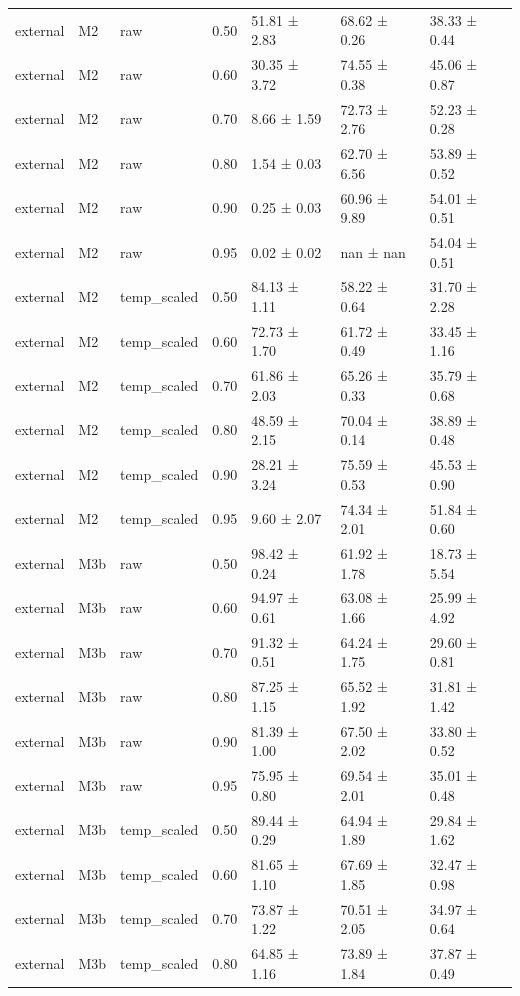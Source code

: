 \begin{tabular}{lllrlll}
external & M2 & raw & 0.50 & 51.81 ± 2.83 & 68.62 ± 0.26 & 38.33 ± 0.44 \\
external & M2 & raw & 0.60 & 30.35 ± 3.72 & 74.55 ± 0.38 & 45.06 ± 0.87 \\
external & M2 & raw & 0.70 & 8.66 ± 1.59 & 72.73 ± 2.76 & 52.23 ± 0.28 \\
external & M2 & raw & 0.80 & 1.54 ± 0.03 & 62.70 ± 6.56 & 53.89 ± 0.52 \\
external & M2 & raw & 0.90 & 0.25 ± 0.03 & 60.96 ± 9.89 & 54.01 ± 0.51 \\
external & M2 & raw & 0.95 & 0.02 ± 0.02 & nan ± nan & 54.04 ± 0.51 \\
external & M2 & temp\_scaled & 0.50 & 84.13 ± 1.11 & 58.22 ± 0.64 & 31.70 ± 2.28 \\
external & M2 & temp\_scaled & 0.60 & 72.73 ± 1.70 & 61.72 ± 0.49 & 33.45 ± 1.16 \\
external & M2 & temp\_scaled & 0.70 & 61.86 ± 2.03 & 65.26 ± 0.33 & 35.79 ± 0.68 \\
external & M2 & temp\_scaled & 0.80 & 48.59 ± 2.15 & 70.04 ± 0.14 & 38.89 ± 0.48 \\
external & M2 & temp\_scaled & 0.90 & 28.21 ± 3.24 & 75.59 ± 0.53 & 45.53 ± 0.90 \\
external & M2 & temp\_scaled & 0.95 & 9.60 ± 2.07 & 74.34 ± 2.01 & 51.84 ± 0.60 \\
external & M3b & raw & 0.50 & 98.42 ± 0.24 & 61.92 ± 1.78 & 18.73 ± 5.54 \\
external & M3b & raw & 0.60 & 94.97 ± 0.61 & 63.08 ± 1.66 & 25.99 ± 4.92 \\
external & M3b & raw & 0.70 & 91.32 ± 0.51 & 64.24 ± 1.75 & 29.60 ± 0.81 \\
external & M3b & raw & 0.80 & 87.25 ± 1.15 & 65.52 ± 1.92 & 31.81 ± 1.42 \\
external & M3b & raw & 0.90 & 81.39 ± 1.00 & 67.50 ± 2.02 & 33.80 ± 0.52 \\
external & M3b & raw & 0.95 & 75.95 ± 0.80 & 69.54 ± 2.01 & 35.01 ± 0.48 \\
external & M3b & temp\_scaled & 0.50 & 89.44 ± 0.29 & 64.94 ± 1.89 & 29.84 ± 1.62 \\
external & M3b & temp\_scaled & 0.60 & 81.65 ± 1.10 & 67.69 ± 1.85 & 32.47 ± 0.98 \\
external & M3b & temp\_scaled & 0.70 & 73.87 ± 1.22 & 70.51 ± 2.05 & 34.97 ± 0.64 \\
external & M3b & temp\_scaled & 0.80 & 64.85 ± 1.16 & 73.89 ± 1.84 & 37.87 ± 0.49 \\

\end{tabular}

